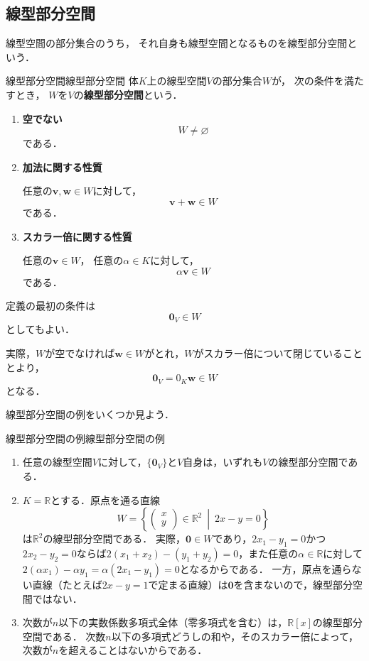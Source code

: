 \subsection{線型部分空間}

線型空間の部分集合のうち，
それ自身も線型空間となるものを線型部分空間という．

\begin{definition}{線型部分空間}{線型部分空間}
  体$K$上の線型空間$V$の部分集合$W$が，
  次の条件を満たすとき，
  $W$を$V$の\textbf{線型部分空間}という．
\begin{enumerate}[label=(\roman*),leftmargin=3.2em]
    \item \textbf{空でない}
    \[
      W\neq\varnothing
    \]
    である．

    \item \textbf{加法に関する性質}

    任意の$\bm{v},\bm{w}\in W$に対して，
    \[
      \bm{v}+\bm{w}\in W
    \]
    である．

    \item \textbf{スカラー倍に関する性質}

    任意の$\bm{v}\in W$，
    任意の$\alpha\in K$に対して，
    \[
      \alpha \bm{v}\in W
    \]
    である．
  \end{enumerate}
\end{definition}

\begin{remark}[空でないことと零ベクトル]
定義の最初の条件は
\[
\bm{0}_V\in W
\]
としてもよい．

実際，$W$が空でなければ$\bm{w} \in W$がとれ，$W$がスカラー倍について閉じていることとより，
\[
\bm{0}_V = 0_K \bm{w} \in W
\]
となる．
\end{remark}

線型部分空間の例をいくつか見よう．

\begin{example}{線型部分空間の例}{線型部分空間の例}
  \begin{enumerate}[label=(\arabic*),leftmargin=3.2em]
    \item 任意の線型空間$V$に対して，$\{\bm{0}_V\}$と$V$自身は，いずれも$V$の線型部分空間である．
    \item $K = \mathbb{R}$とする．原点を通る直線
      \[
        W = \left\{ \begin{pmatrix} x \\ y \end{pmatrix} \in \mathbb{R}^2 ~\middle|~ 2x - y = 0 \right\}
      \]
      は$\mathbb{R}^2$の線型部分空間である．
      実際，$\bm{0} \in W$であり，$2x_1 - y_1 = 0$かつ$2x_2 - y_2 = 0$ならば$2(x_1 + x_2) - (y_1 + y_2) = 0$，また任意の$\alpha \in \mathbb{R}$に対して$2(\alpha x_1) - \alpha y_1 = \alpha(2x_1 - y_1) = 0$となるからである．
      一方，原点を通らない直線（たとえば$2x - y = 1$で定まる直線）は$\bm{0}$を含まないので，線型部分空間ではない．
    \item 次数が$n$以下の実数係数多項式全体（零多項式を含む）は，$\mathbb{R}[x]$の線型部分空間である．
      次数$n$以下の多項式どうしの和や，そのスカラー倍によって，次数が$n$を超えることはないからである．
  \end{enumerate}
\end{example}

